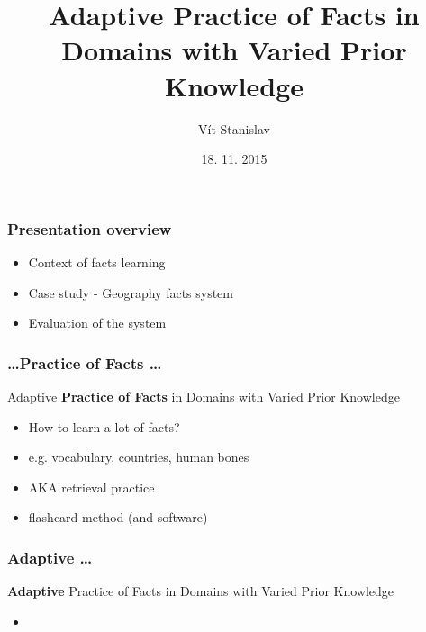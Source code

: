 \documentclass[xcolor=svgnames]{beamer}
\title[slepemapy.cz]{Adaptive Practice of Facts in Domains with Varied Prior Knowledge}
\author{Vít Stanislav}
\institute{Masaryk University, Brno}      %
\date{18. 11. 2015}
\begin{document}
\frame[plain]{\titlepage}
\begin{frame}
	\frametitle{Presentation overview}
	\begin{itemize}
    \item Context of facts learning
    \item Case study - Geography facts system
    \item Evaluation of the system
    \
	\end{itemize}
\end{frame}
\begin{frame}
	\frametitle{\ldots Practice of Facts \ldots}
   Adaptive \textbf{Practice of Facts} in Domains with Varied Prior Knowledge
	\begin{itemize}
    \item How to learn a lot of facts?
	  \item e.g. vocabulary, countries, human bones 
	  \item AKA retrieval practice
    \item flashcard method (and software)
    \
	\end{itemize}
\end{frame}
\begin{frame}
	\frametitle{Adaptive \ldots}
   \textbf{Adaptive} Practice of Facts in Domains with Varied Prior Knowledge
	\begin{itemize}
    \item 
    \
	\end{itemize}
\end{frame}
\end{document}
